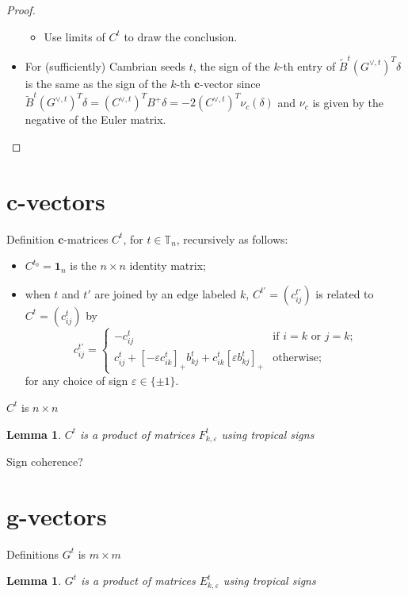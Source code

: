 \documentclass{amsart}
\newtheorem{lemma}[theorem]{Lemma}
\numberwithin{theorem}{section}
\newcommand{\bfc}{\boldsymbol{c}}
\newcommand{\bfg}{\boldsymbol{g}}
\newcommand{\TT}{\mathbb{T}}
\begin{document}
\begin{proof}
\begin{itemize}
\begin{itemize}
          \item Use limits of $C^t$ to draw the conclusion.
        \end{itemize}
      \item For (sufficiently) Cambrian seeds $t$, the sign of the $k$-th entry of $\tilde B^t (G^{\vee,t})^T \delta$ is the same as the sign of the $k$-th $\bfc$-vector since $\tilde B^t (G^{\vee,t})^T \delta=(C^{\vee,t})^T B^+ \delta = -2 (C^{\vee,t})^T \nu_c(\delta)$ and $\nu_c$ is given by the negative of the Euler matrix.
    \end{itemize}

  \end{proof}


  \section{$\bfc$-vectors}

  Definition $\bfc$-matrices $C^t$, for $t\in\TT_n$, recursively as follows:
  \begin{itemize}
    \item $C^{t_0} = \boldsymbol{1}_n$ is the $n\times n$ identity matrix;
    \item when $t$ and $t'$ are joined by an edge labeled $k$, $C^{t'}=(c^{t'}_{ij})$ is related to $C^t=(c^t_{ij})$ by
      \[ c^{t'}_{ij} = \begin{cases} -c^t_{ij} & \text{if $i=k$ or $j=k$;}\\ c^t_{ij} + [-\varepsilon c^t_{ik}]_+ b^t_{kj} + c^t_{ik} [\varepsilon b^t_{kj}]_+ & \text{otherwise;} \end{cases} \]
        for any choice of sign $\varepsilon\in\{\pm1\}$.
  \end{itemize}

  $C^t$ is $n\times n$
  \begin{lemma}
    $C^t$ is a product of matrices $F^t_{k,\varepsilon}$ using tropical signs
  \end{lemma}

  Sign coherence?



  \section{$\bfg$-vectors}
  Definitions $G^t$ is $m\times m$
  \begin{lemma}
    $G^t$ is a product of matrices $E^t_{k,\varepsilon}$ using tropical signs
  \end{lemma}
\end{document}
